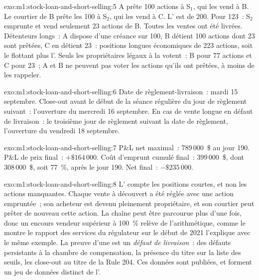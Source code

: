 \begin{solution}{exo:m1:stock-loan-and-short-selling:5}
A prête 100 actions à S$_1$, qui les vend à B. Le courtier de B prête les 100 à
S$_2$, qui les vend à C. L' est de 200. Pour 123~: S$_2$ emprunte et
vend seulement 23 actions de B. Toutes les ventes ont été livrées. Détenteurs longs~: A dispose
d'une créance sur 100, B détient 100 actions dont 23 sont prêtées, C en détient 23~: positions
longues économiques de 223 actions, soit le flottant plus l'. Seuls les propriétaires légaux
à la  votent~: B pour 77 actions et C pour 23~; A et B ne peuvent pas voter les
actions qu'ils ont prêtées, à moins de les rappeler.
\end{solution}

\begin{solution}{exo:m1:stock-loan-and-short-selling:6}
Date de règlement-livraison~: mardi 15 septembre. Close-out avant le début de la séance
régulière du jour de règlement suivant~: l'ouverture du mercredi 16
septembre. En cas de vente longue en défaut de livraison~: le troisième jour de règlement suivant la
date de règlement, l'ouverture du vendredi 18 septembre.
\end{solution}

\begin{solution}{exo:m1:stock-loan-and-short-selling:7}
P\&L net maximal~: 789\,000~\$ au jour 190. P\&L de prix final~: $+\$164\,000$. Coût d'emprunt
cumulé final~: 399\,000~\$, dont 308\,000~\$, soit 77~\%, après le jour
190. Net final~: $-\$235\,000$.
\end{solution}

\begin{solution}{exo:m1:stock-loan-and-short-selling:8}
L' compte les positions courtes, et non les actions manquantes. Chaque vente à découvert
a été réglée avec une action empruntée~; son acheteur est devenu pleinement propriétaire, et son
courtier peut prêter de nouveau cette action. La chaîne peut être parcourue plus d'une fois,
donc un encours vendeur supérieur à 100~\% relève de l'arithmétique, comme le montre le rapport des services du
régulateur sur le début de 2021 l'explique avec le même exemple. La preuve d'une  est
un \emph{défaut de livraison}~: des défauts persistants à la chambre de compensation, la
présence du titre sur la liste des seuils, les close-out au titre de la Rule 204. Ces données sont
publiées, et forment un jeu de données distinct de l'.
\end{solution}

